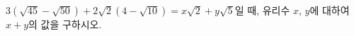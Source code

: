 $3(\sqrt{45}-\sqrt{50})+2\sqrt{2}(4-\sqrt{10})=x\sqrt{2}+y\sqrt{5}$일 때, 유리수 $x$, $y$에 대하여 $x+y$의 값을 구하시오.
